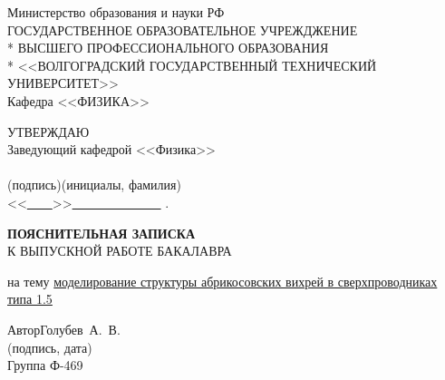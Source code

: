 \begin{titlepage}
	\begin{center}
		Министерство образования и науки РФ \\
		\vspace{.5cm}
		ГОСУДАРСТВЕННОЕ ОБРАЗОВАТЕЛЬНОЕ УЧРЕЖДЖЕНИЕ\\*
		ВЫСШЕГО ПРОФЕССИОНАЛЬНОГО ОБРАЗОВАНИЯ\\*
		<<ВОЛГОГРАДСКИЙ ГОСУДАРСТВЕННЫЙ ТЕХНИЧЕСКИЙ УНИВЕРСИТЕТ>>\\
		\vspace{.5cm}
		Кафедра <<ФИЗИКА>>
		\vspace{.5cm}
	\end{center}
\begin{flushright}
	УТВЕРЖДАЮ\\
	Заведующий кафедрой <<Физика>>\\
	\vspace{.3cm}
	\underline{\hspace{2cm}}\hspace{1cm}\underline{\hspace{4cm}}\\
	\vspace{-.2cm}\footnotesize(подпись)\hspace{1.8cm}(инициалы, фамилия)
		\hspace*{.2cm}\ \normalsize\\
	\vspace{.3cm}
	<<\underline{\ \ \ \ }>>\underline{\ \ \ \ \ \ \ \ \ \ \ \ \ \ } \the{}.
\end{flushright}
\begin{center}
	\LARGE \textbf{ПОЯСНИТЕЛЬНАЯ ЗАПИСКА} \\
	\large К ВЫПУСКНОЙ РАБОТЕ БАКАЛАВРА
\end{center}
\begin{center}
	на тему \underline{моделирование структуры абрикосовских вихрей в 
		сверхпроводниках типа 1.5}
\end{center}
\begin{flushleft}
	Автор\hspace{.7cm}Голубев~А.~В.\hfill\underline{\hspace{5cm}}\\
	\vspace{-.2cm}\hspace{14cm}\footnotesize(подпись, дата)\normalsize\\
	\vspace{-.5cm}
	Группа Ф-469\\

\end{flushleft}
\end{titlepage}
